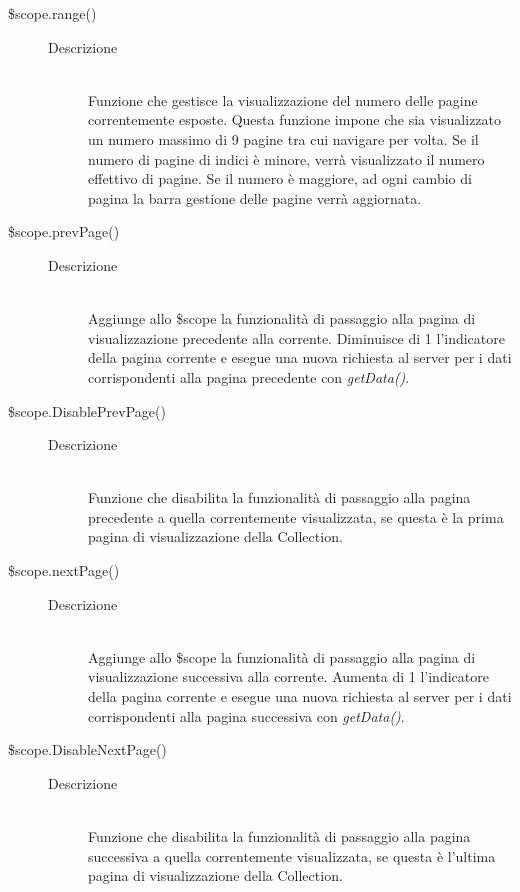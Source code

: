 \begin{description}
\begin{description}
  \item[\$scope.range()] \hfill
  \begin{description}
  	\item[Descrizione] \hfill \\
  	Funzione che gestisce la visualizzazione del numero delle pagine correntemente esposte. Questa funzione impone che sia visualizzato un numero massimo di 9 pagine tra cui navigare per volta. Se il numero di pagine di indici è minore, verrà visualizzato il numero effettivo di pagine. Se il numero è maggiore, ad ogni cambio di pagina la barra gestione delle pagine verrà aggiornata.
  \end{description}
  
  \item[\$scope.prevPage()] \hfill 
  \begin{description}
  	\item[Descrizione] \hfill \\
  	Aggiunge allo \$scope la funzionalità di passaggio alla pagina di visualizzazione precedente alla corrente. Diminuisce di 1 l'indicatore della pagina corrente e esegue una nuova richiesta al server per i dati corrispondenti alla pagina precedente con \textit{getData()}.
  \end{description}
  
  \item[\$scope.DisablePrevPage()] \hfill
  \begin{description}
  	\item[Descrizione] \hfill \\
  	Funzione che disabilita la funzionalità di passaggio alla pagina precedente a quella correntemente visualizzata, se questa è la prima pagina di visualizzazione della Collection.
  \end{description}
  
  \item[\$scope.nextPage()] \hfill
  \begin{description}
  	\item[Descrizione] \hfill \\
  Aggiunge allo \$scope la funzionalità di passaggio alla pagina di visualizzazione successiva alla corrente. Aumenta di 1 l'indicatore della pagina corrente e esegue una nuova richiesta al server per i dati corrispondenti alla pagina successiva con \textit{getData()}.
  \end{description}
  
  \item[\$scope.DisableNextPage()] \hfill
  \begin{description}
  	\item[Descrizione] \hfill \\
  	Funzione che disabilita la funzionalità di passaggio alla pagina successiva a quella correntemente visualizzata, se questa è l'ultima pagina di visualizzazione della Collection.
  \end{description}
  

\end{description}
\end{description}
